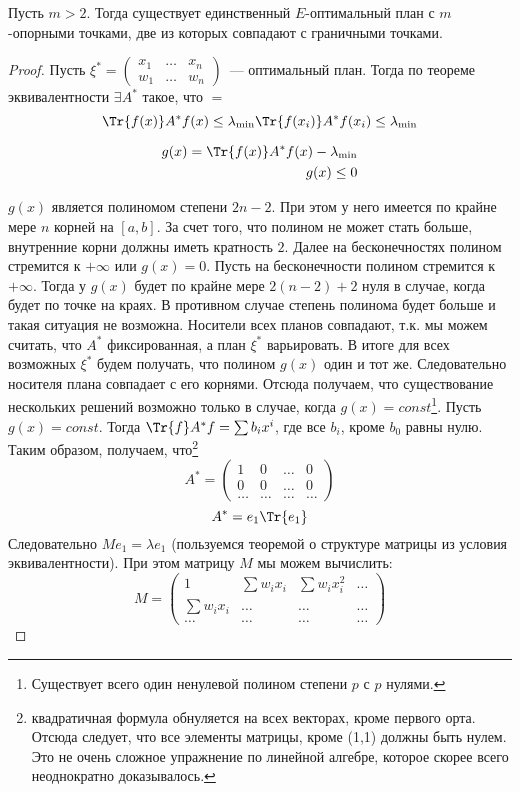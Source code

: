\begin{thm}
Пусть $m > 2$. Тогда существует единственный $E$-оптимальный план с $m$-опорными точками, две из которых совпадают с граничными точками.
\end{thm}
\begin{proof}
Пусть $\xi^* = \begin{pmatrix} x_1 & … & x_n \\ w_1 & … & w_n \end{pmatrix}$ — оптимальный план. Тогда по теореме эквивалентности $\exists A^{*}$ такое, что $=$
\begin{equation}
\Tr{f(x)}A^{*}f(x) \leq \lambda_{\min} \\
\Tr{f(x_i)}A^{*}f(x_i) \leq \lambda_{\min}
\end{equation}

\begin{equation}
\begin{split}
g(x) = \Tr{f(x)}A^{*} f(x) - \lambda_{\min} \\
g(x) \leq 0
\end{split}
\end{equation}

$g(x)$ является полиномом степени $2n-2$. При этом у него имеется по крайне мере $n$ корней на $[a,b]$. За счет того, что полином не может стать больше, внутренние корни должны иметь кратность $2$. Далее на бесконечностях полином стремится к $+\infty$ или $g(x) =0$. Пусть на бесконечности полином стремится к $+\infty$. Тогда у $g(x)$
будет по крайне мере  $2(n-2)+2$ нуля в случае, когда будет по точке на краях. В противном случае степень полинома будет больше и такая ситуация не возможна.  
Носители всех планов совпадают, т.к. мы можем считать, что $A^{*}$ фиксированная,  а план $\xi^{*}$ варьировать.  В итоге для всех возможных $\xi^{*}$ будем получать, что полином $g(x)$ один и тот же. Следовательно носителя плана совпадает с его корнями. Отсюда получаем, что существование нескольких решений возможно только в случае, когда $g(x) = const$\footnote{Существует всего один ненулевой полином степени $p$ с $p$ нулями.}.
Пусть $g(x) = const$. Тогда $\Tr{f}A^{*}f = \sum b_i x^i$,  где все $b_i$, кроме $b_0$ равны нулю. Таким образом, получаем, что\footnote{квадратичная формула обнуляется на всех векторах, кроме первого орта. Отсюда следует, что все элементы матрицы, кроме (1,1) должны быть нулем. Это не очень сложное упражнение по линейной алгебре, которое скорее всего неоднократно доказывалось.} 
$$ A^{*} = \begin{pmatrix} 1 & 0 & … & 0 \\ 0 & 0 & … & 0 \\ … & … & … & … \end{pmatrix}$$
$$A^{*} = e_1 \Tr{e_1}$$
Следовательно $Me_1 = \lambda e_1$ (пользуемся теоремой о структуре матрицы из условия эквивалентности). При этом матрицу $M$ мы можем вычислить:
$$ M = \begin{pmatrix} 1 & \sum w_ix_i & \sum w_ix_i^2 & … \\ \sum w_i x_i & … & … & …\\  … & … & … & … \end{pmatrix} $$


\end{proof}
